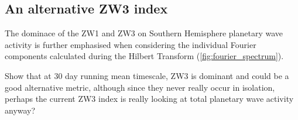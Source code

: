\subsection{An alternative ZW3 index}

The dominace of the ZW1 and ZW3 on Southern Hemisphere planetary wave activity is further emphasised when considering the individual Fourier components calculated during the Hilbert Transform (\ref{fig:fourier_spectrum}).


Show that at 30 day running mean timescale, ZW3 is dominant and could be a good alternative metric, although since they never really occur in isolation, perhaps the current ZW3 index is really looking at total planetary wave activity anyway?